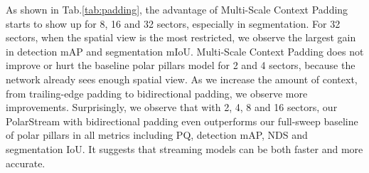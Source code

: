 \documentclass{article}
\begin{document}
As shown in Tab.\ref{tab:padding}, the advantage of Multi-Scale Context Padding starts to show up for 8, 16 and 32 sectors, especially in segmentation. For 32 sectors, when the spatial view is the most restricted, we observe the largest gain in detection mAP and segmentation mIoU. Multi-Scale Context Padding does not improve or hurt the baseline polar pillars model for 2 and 4 sectors, because the network already sees enough spatial view. As we increase the amount of context, from trailing-edge padding to bidirectional padding, we observe more improvements. Surprisingly, we observe that with 2, 4, 8 and 16 sectors, our PolarStream with bidirectional padding even outperforms our full-sweep baseline of polar pillars in all metrics including PQ, detection mAP, NDS and segmentation IoU. It suggests that streaming models can be both faster and more accurate.
\end{document}
